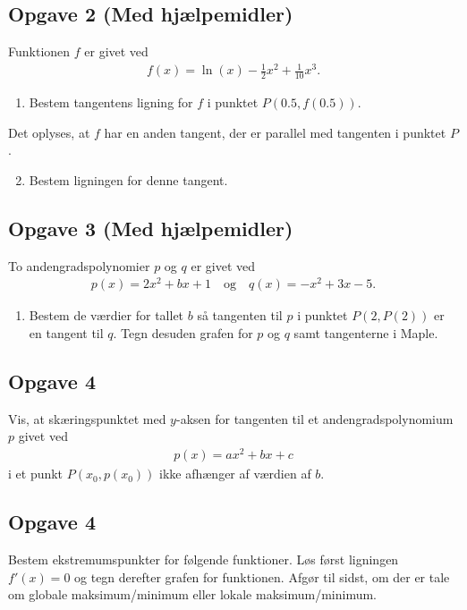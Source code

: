 \subsection*{Opgave 2 (Med hjælpemidler)}
Funktionen $f$ er givet ved
\begin{align*}
	f(x) = \ln(x) - \frac{1}{2}x^2 + \frac{1}{10}x^3.
\end{align*}
\begin{enumerate}[label=\roman*)]
	\item Bestem tangentens ligning for $f$ i punktet $P(0.5,f(0.5))$.
\end{enumerate}
Det oplyses, at $f$ har en anden tangent, der er parallel med tangenten i punktet $P$.
\begin{enumerate}[label=\roman*)]
	\setcounter{enumi}{1}
	\item Bestem ligningen for denne tangent.
\end{enumerate}

\subsection*{Opgave 3 (Med hjælpemidler)}
To andengradspolynomier $p$ og $q$ er givet ved
\begin{align*}
	p(x) = 2x^2+bx+1 \quad \text{og} \quad q(x) = -x^2+3x-5.
\end{align*}
\begin{enumerate}[label=\roman*)]
	\item Bestem de værdier for tallet $b$ så tangenten til $p$ i punktet $P(2,P(2))$ er en tangent til $q$. Tegn desuden grafen for $p$ og $q$ samt tangenterne i Maple.
\end{enumerate}

\subsection*{Opgave 4}
Vis, at skæringspunktet med $y$-aksen for tangenten til et andengradspolynomium $p$ givet ved
\begin{align*}
	p(x) = ax^2 + bx + c
\end{align*}
i et punkt $P(x_0,p(x_0))$ ikke afhænger af værdien af $b$.

\newpage

\subsection*{Opgave 4}

Bestem ekstremumspunkter for følgende funktioner. Løs først ligningen $f'(x)=0$ og tegn derefter grafen for funktionen.  Afgør til sidst, om der er tale om globale maksimum/minimum eller lokale maksimum/minimum.

